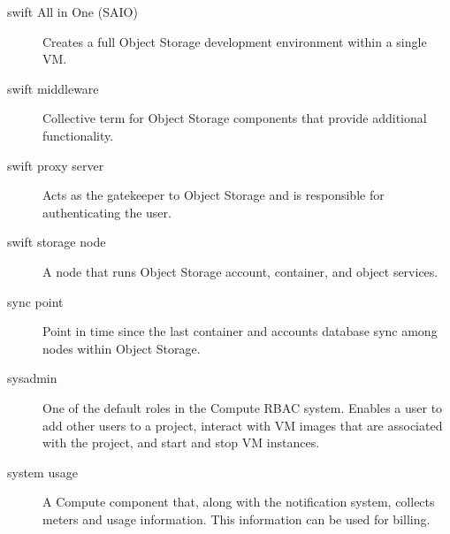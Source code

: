 \documentclass[letterpaper,10pt,english]{sphinxmanual}
\begin{document}
\begin{description}
\item[{swift All in One (SAIO)}] \leavevmode{}\label{_source/glossary:term-swift-all-in-one-saio}
Creates a full Object Storage development environment within a
single VM.

\item[{swift middleware}] \leavevmode{}\label{_source/glossary:term-swift-middleware}
Collective term for Object Storage components that provide
additional functionality.

\item[{swift proxy server}] \leavevmode{}\label{_source/glossary:term-swift-proxy-server}
Acts as the gatekeeper to Object Storage and is responsible for
authenticating the user.

\item[{swift storage node}] \leavevmode{}\label{_source/glossary:term-swift-storage-node}
A node that runs Object Storage account, container, and object
services.

\item[{sync point}] \leavevmode{}\label{_source/glossary:term-sync-point}
Point in time since the last container and accounts database
sync among nodes within Object Storage.

\item[{sysadmin}] \leavevmode{}\label{_source/glossary:term-sysadmin}
One of the default roles in the Compute RBAC system. Enables a
user to add other users to a project, interact with VM images that are
associated with the project, and start and stop VM instances.

\item[{system usage}] \leavevmode{}\label{_source/glossary:term-system-usage}
A Compute component that, along with the notification system,
collects meters and usage information. This information can be used
for billing.

\end{description}
\end{document}
